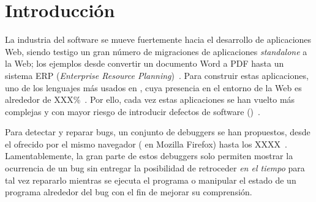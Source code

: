 \documentclass[conference]{IEEEtran}
\begin{document}
\section{Introducci\'on}
\label{sec:intro}

La industria del software se mueve fuertemente hacia el desarrollo de aplicaciones Web, siendo testigo un gran n\'umero de migraciones de aplicaciones {\em standalone} a la Web; los ejemplos desde convertir un documento Word a PDF hasta un sistema ERP ({\em Enterprise Resource Planning})~. Para construir estas aplicaciones, uno de los lenguajes m\'as usados en \javascript, cuya presencia en el entorno de la Web es alrededor de XXX\%~. Por ello, cada vez estas aplicaciones se han vuelto más complejas y con mayor riesgo de introducir defectos de software ()~. 

	Para detectar y reparar bugs, un conjunto de debuggers se han propuestos, desde el ofrecido por el mismo navegador ( en Mozilla Firefox) hasta los XXXX~. Lamentablemente, la gran parte de estos debuggers solo permiten mostrar la ocurrencia de un bug sin entregar la posibilidad de retroceder {\em en el tiempo} para tal vez repararlo mientras se ejecuta el programa o manipular el estado de un programa alrededor del bug con el fin de mejorar su comprensi\'on.      


\bigskip
\bigskip
\bigskip

\\

\\

\\

\\

\\
\end{document}

